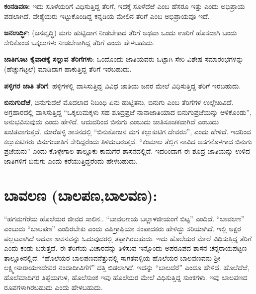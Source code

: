 \textbf{ಕಂನಡಿವಣ: } ಇದು ಸೂಳೆಯರಿಗೆ ವಿಧಿಸುತ್ತಿದ್ದ ತೆರಿಗೆ, ಇದಕ್ಕೆ ಸೂಳೆದೆಱೆ ಎಂಬ ಹೆಸರೂ ಇತ್ತು ಎಂದು ಅಭಿಪ್ರಾಯ ಪಡಲಾಗಿದೆ. ವೇಶ್ಯೆಯರು ಇಟ್ಟುಕೊಂಡಿದ್ದ ಕನ್ನಡಿಯ ಮೇಲಿನ ತೆರಿಗೆ ಎಂಬ ಅಭಿಪ್ರಾಯವೂ ಇದೆ.

\textbf{ಜನಉರ್ದ್ಧಿ}: (ಜನವೃದ್ಧಿ) ಮಗು ಹುಟ್ಟಿದಾಗ ನೀಡಬೇಕಾದ ತೆರಿಗೆ ಅಥವಾ ಒಂದು ಊರಿಗೆ ಹೊಸದಾಗಿ ಬಂದು ಸೇರಿಕೊಂಡ ಒಕ್ಕಲುಗಳು ನೀಡಬೇಕಾಗಿದ್ದ ತೆರಿಗೆ ಎಂದು ಹೇಳಬಹುದು.

\textbf{ಜಾತಿಗೂಟ ಕೈವಾಡಕ್ಕೆ ಸಲ್ಲುವ ತೆರಿಗೆಗಳು}: ಒಂದೊಂದು ಜಾತಿಯವರು ಒಟ್ಟಾಗಿ ಸೇರಿ ವಿಶೇಷ ಸಮಾರಂಭಗಳನ್ನು (ಹೆಚ್ಚುಗಟ್ಟಲೆ) ಮಾಡಿದಾಗ ಹಾಕುತ್ತಿದ್ದ ತೆರಿಗೆ ಇರಬಹುದು.

\textbf{ಪಳ್ಳಿಗರ ಜಾತಿ ತೆರಿಗೆ}: ಹಳ್ಳಿಗಳಲ್ಲಿ ವಾಸಿಸುತ್ತಿದ್ದ ವಿವಿಧ ಜಾತಿಯ ಜನರ ಮೇಲೆ ವಿಧಿಸುತ್ತಿದ್ದ ತೆರಿಗೆ ಇರಬಹುದು.

\textbf{ಬಿನುಗುದೆಱೆ}, ಬಿನುಗುದೆಱೆ ಮೊದಲಾದ ನಿಬಂಧಿ ಏನು ಹುಟ್ಟಿತನು, ಬಿನುಗು ಎಂಬ ತೆರಿಗೆಗಳ ಉಲ್ಲೇಖವಿದೆ. ಅಗ್ರಹಾರದಲ್ಲಿ ವಾಸಿಸುತ್ತಿದ್ದ “ಒಕ್ಕಲುಮಕ್ಕಳು ಸಹ ಶೂದ್ರಪ್ರಜೆ ನಾನಾಜಾತಿಯಾದ ಬಿನುಗುಪ್ರಜೆಯನ್ನು ಆಳಿಕೊಂಡು”, ಅನುಭವಿಸುವುದು ಎಂದು ಹೇಳಿದೆ. ಆದುದರಿಂದ ಬಿನುಗು ಎಂಬುದು ಜಾತಿಸೂಚಕವಾಗಿದೆ ಎಂಬುದು ಖಚಿತವಾಗುತ್ತದೆ. ಮಾರೆಹಳ್ಳಿ ಶಾಸನದಲ್ಲಿ “ಬಿನುಕೋಜನ ಮಗ ಕಲ್ಲುಕುಟಿಗ ದೇವರಸ”, ಎಂದು ಹೇಳಿದೆ. ಇದರಿಂದ ಕಲ್ಲುಕುಟಿಗರು ಬಿನುಗುಜಾತಿಗೆ ಸೇರಿದ್ದರೆಂದು ತಿಳಿದುಬರುತ್ತದೆ. “ಕಂಮಾಱ ತೆಲ್ಲಿಗ ನಾವಿದ ಅಸಗನೊಳಗಾದ ಬಿನುಗು ಪ್ರಜೆಯನು” ಎಂದು ಕೊಳ್ಳೇಗಾಲ ತಾಲ್ಲೂಕು ಕಾಮಗೆರೆ ಶಾಸನದಲ್ಲಿದೆ. ಇದರಿಂದಾಗ ಈ ಶೂದ್ರ ಜಾತಿಯನ್ನು ಉಳಿದ ಜಾತಿಗಳಿಗೆ ಬಿನುಗು ಎಂದು ಕರೆಯುತ್ತಿದ್ದರೆಂದು ಹೇಳಬಹುದು.


\section{ಬಾವಲಣ\protect{} (ಬಾಲಪಣ,ಬಾಲವಣ):}

“ಹಗಮಗೆರೆಯ ಹೊಲೆಯರ ಜೀವದ ಸಾಲಿನ.. “ಬಾವಲಣಯ ಬಲ್ಲಾಳಜೀಯಂಗೆ ಬಿಟ್ಟ” ಎಂದಿದೆ. “ಬಾವಲಣ” ಎಂಬುದು “ಬಾಲಪಣ” ಎಂದಿರಬೇಕು ಎಂದು ಎಪಿಗ್ರಾಫಿಯಾ ಸಂಪಾದಕರು ಹೇಳಿದ್ದು ಸರಿಯಾಗಿದೆ. ಇಲ್ಲಿ ಅಕ್ಷರ ಪಲ್ಲಟವಾಗಿದೆ ಅಥವಾ ಶಾಸನವನ್ನು ಓದುವುದರಲ್ಲಿ ತಪ್ಪಾಗಿರಬಹುದು. ಇದು ಹೊಲೆಯರ ಮೇಲೆ ವಿಧಿಸುತ್ತಿದ್ದ ತೆರಿಗೆ ಎಂದು ಕಂಡು ಬರುತ್ತದೆ. ಈ ತೆರಿಗೆಯ ವಿಚಾರವನ್ನು ತಿಳಿಸುವ ಇನ್ನೊಂದು ಅಪರೂಪದ ಶಾಸನ ಚನ್ನರಾಯಪಟ್ಟಣ ತಾಲ್ಲೂಕಿನಲ್ಲಿದೆ. “ಹೊಲೆಯರ ಬಾಲಪಣವನೆತ್ತುವಲ್ಲಿ ಸಾಗತವಳ್ಳಿಯ ಹೊಲೆಯರ ಬಾಲವಣವನು ಶ‍್ರೀ ಲಕ್ಷ್ಮೀನಾರಾಯಣದೇವರ ನಂದಾದೀವಿಗೆಗೆ” ದತ್ತಿ ಬಿಡಲಾಗಿದೆ. ಇದನ್ನು “ಬಾಲದೆರೆ” ಎಂದೂ ಹೇಳಿದೆ. ಹೊಲೆದೆಱೆ, ಹೊಲೆಮಾದಿಗರ ತಿಪ್ಪೆಯಗುಳ, ಹೊಲೆಸುಂಕ ಇವು ಹೊಲೆಯರ ಮೇಲೆ ವಿಧಿಸುತ್ತಿದ್ದ ಸುಂಕಗಳು. ಇವು ಬಾಲಪಣದ ರೂಪಗಳಾಗಿರಬಹುದು ಎಂದು ಹೇಳಬಹುದು.

